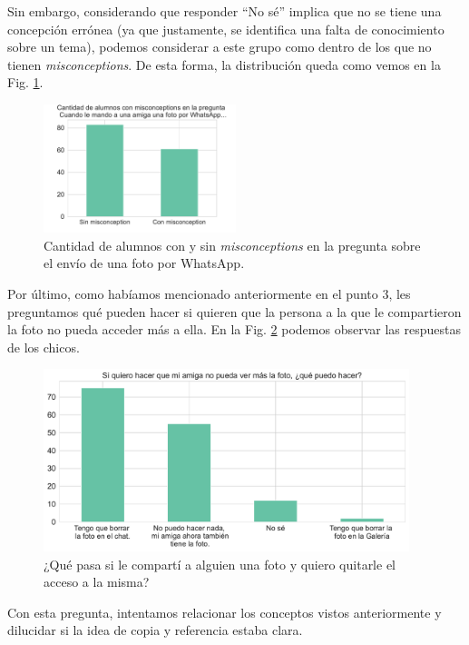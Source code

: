 \newpage

Sin embargo, considerando que responder “No sé” implica que no se tiene una concepción errónea (ya que justamente, se identifica una falta de conocimiento sobre un tema), podemos considerar a este grupo como dentro de los que no tienen \textit{misconceptions}. De esta forma, la distribución queda como vemos en la Fig. \ref{fig:analisis16}.

\begin{figure}[h]
    \centering
    \includegraphics[width=0.5\textwidth]{images_analisis/16.pdf}
    \caption{Cantidad de alumnos con y sin \textit{misconceptions} en la pregunta sobre el envío de una foto por WhatsApp.}
    \label{fig:analisis16}
\end{figure}

Por último, como habíamos mencionado anteriormente en el punto 3, les preguntamos qué pueden hacer si quieren que la persona a la que le compartieron la foto no pueda acceder más a ella. En la Fig. \ref{fig:analisis17} podemos observar las respuestas de los chicos.

\begin{figure}[h]
    \centering
    \includegraphics[width=0.95\textwidth]{images_analisis/17.pdf}
    \caption{¿Qué pasa si le compartí a alguien una foto y quiero quitarle el acceso a la misma?}
    \label{fig:analisis17}
\end{figure}

Con esta pregunta, intentamos relacionar los conceptos vistos anteriormente y dilucidar si la idea de copia y referencia estaba clara.

